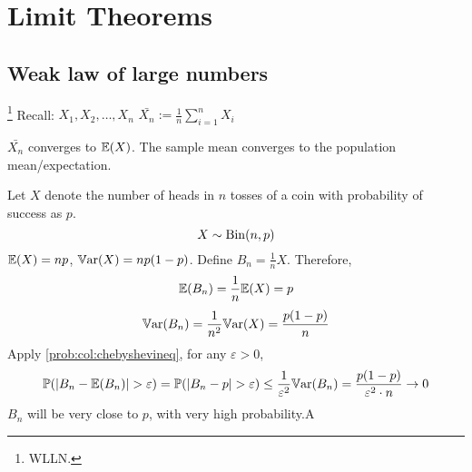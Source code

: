 \documentclass[10pt, a4paper]{article}
\begin{document}
\newpage

\section{Limit Theorems}

\subsection{Weak law of large numbers}\footnote{WLLN.}
Recall:
$X_1, X_2, \dotsc, X_n$
$\bar{X_n} := \frac{1}{n}\sum_{i = 1}^{n}X_i$

$\bar{X_n}$ converges to $\mathbb{E}(X)$.
The sample mean converges to the population mean/expectation.

Let $X$ denote the number of heads in $n$ tosses of a coin with probability of success as $p$.
\[
X \sim \operatorname{Bin}(n, p)
\]
$\mathbb{E}(X) = np$,
$\mathbb{V}\mathrm{ar}(X) = np(1 - p)$.
Define $B_n = \frac{1}{n}X$.
Therefore,
\[
\mathbb{E}(B_n) = \frac{1}{n}\mathbb{E}(X) = p
\]
\[
\mathbb{V}\mathrm{ar}(B_n) = \frac{1}{n ^ 2}\mathbb{V}\mathrm{ar}(X) = \frac{p(1 - p)}{n}
\]
Apply \autoref{prob:col:chebyshevineq},
for any $\varepsilon > 0$,
\[
\mathbb{P}(|B_n - \mathbb{E}(B_n)| > \varepsilon) = \mathbb{P}(|B_n - p| > \varepsilon) \leq \frac{1}{\varepsilon ^ 2}\mathbb{V}\mathrm{ar}(B_n) = \frac{p(1 - p)}{\varepsilon ^ 2 \cdot n} \rightarrow 0
\]
$B_n$ will be very close to $p$,
with very high probability.A
\end{document}
